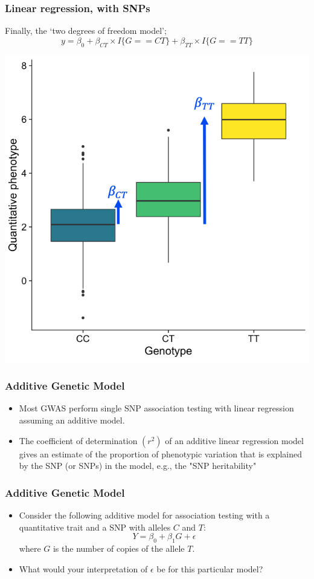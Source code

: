 \documentclass{beamer}
\begin{document}
\begin{frame}
	\frametitle{\bf Linear regression, with SNPs}
	Finally, the `two degrees of freedom model';
	\[
	y = \beta_0 + \beta_{CT}\times I\{G== CT\} + \beta_{TT}\times I\{G== TT\}
	\]
	
	\centerline{
	\includegraphics[scale=.3]{Figures/lm_cat.png}	}
	
\end{frame}


\begin{frame}
	\frametitle{\bf Additive Genetic Model}
	\begin{itemize}
				\item  Most GWAS perform single SNP association testing with linear regression assuming an additive model. 
		\item The coefficient of determination $(r^2)$ of an additive linear regression model  gives an estimate of the proportion of phenotypic variation that is explained by the SNP (or SNPs) in the model, e.g., the "SNP heritability" 
	\end{itemize}
\end{frame}


\begin{frame}
	\frametitle{\bf Additive Genetic Model}
	\begin{itemize}
		\item Consider the following additive model for  association testing with a quantitative trait and a SNP with alleles $C$ and $T$: 
		\[ Y=\beta_{0} + \beta_{1}G + \epsilon \]
		where $G$ is the number of copies of the allele $T$.
		\item What would your interpretation of $\epsilon$ be for this particular model?
	\end{itemize}
\end{frame}
\end{document}
